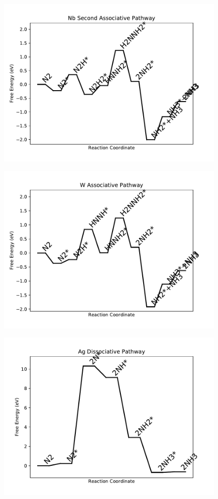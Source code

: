 \begin{figure}
\includegraphics[width=0.8\linewidth]{data/plots/Nb_associative_2.pdf}
\label{fig:Nb_associative_2}
\end{figure}

\begin{figure}
\includegraphics[width=0.8\linewidth]{data/plots/W_associative.pdf}
\label{fig:W_associative}
\end{figure}

\begin{figure}
\includegraphics[width=0.8\linewidth]{data/plots/Ag_dissociative.pdf}
\label{fig:Ag_dissociative}
\end{figure}

